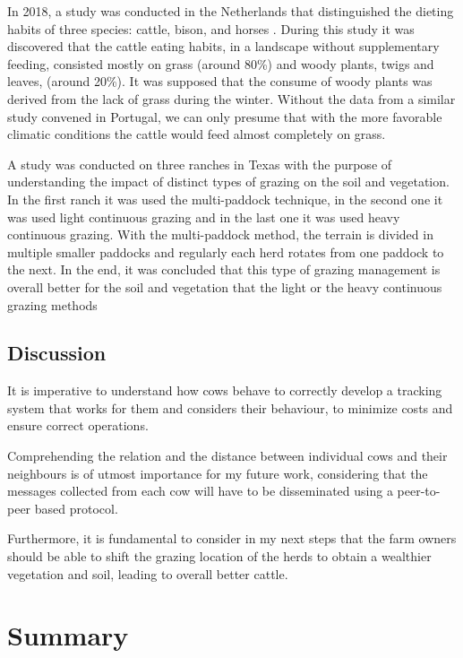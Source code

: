 In 2018, a study was conducted in the Netherlands that distinguished the dieting habits of
three species: cattle, bison, and horses \cite{Cromsigt2018}. During this study it was
discovered that the cattle eating habits, in a landscape without supplementary feeding,
consisted mostly on grass (around 80\%) and woody plants, twigs and leaves, (around 20\%). It
was supposed that the consume of woody plants was derived from the lack of grass during the
winter. Without the data from a similar study convened in Portugal, we can only presume that
with the more favorable climatic conditions the cattle would feed almost completely on grass.

A study was conducted on three ranches in Texas with the purpose of understanding the impact
of distinct types of grazing on the soil and vegetation. In the first ranch it was used the
multi-paddock technique, in the second one it was used light continuous grazing and in the
last one it was used heavy continuous grazing. With the multi-paddock method, the terrain is
divided in multiple smaller paddocks and regularly each herd rotates from one paddock to the
next. In the end, it was concluded that this type of grazing management is overall better for
the soil and vegetation that the light or the heavy continuous grazing methods \cite{Teague2011}

\subsection{Discussion}
\label{subsec:cow_discussion}
It is imperative to understand how cows behave to correctly develop a tracking system that
works for them and considers their behaviour, to minimize costs and ensure correct operations.

Comprehending the relation and the distance between individual cows and their neighbours is
of utmost importance for my future work, considering that the messages collected from each
cow will have to be disseminated using a peer-to-peer based protocol.

Furthermore, it is fundamental to consider in my next steps that the farm owners should be able
to shift the grazing location of the herds to obtain a wealthier vegetation and soil, leading
to overall better cattle.


\section{Summary}
\label{sec:summary}
